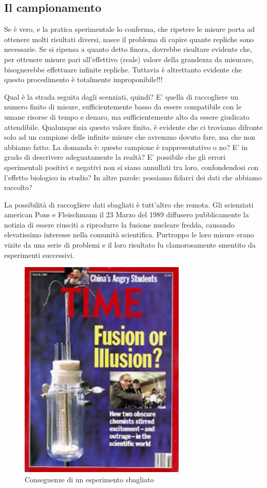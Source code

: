 \documentclass[a4paper,12pt,oneside]{book}
\theoremstyle{definition}
\theoremstyle{definition}
\theoremstyle{definition}
\theoremstyle{remark}
\begin{document}
\subsection{Il campionamento}\label{il-campionamento}

Se è vero, e la pratica sperimentale lo conferma, che ripetere le misure
porta ad ottenere molti risultati diversi, nasce il problema di capire
quante repliche sono necessarie. Se si ripensa a quanto detto finora,
dovrebbe risultare evidente che, per ottenere misure pari all'effettivo
(reale) valore della grandezza da misurare, bisognerebbe effettuare
infinite repliche. Tuttavia è altrettanto evidente che questo
procedimento è totalmente improponibile!!!

Qual è la strada seguita dagli scenziati, quindi? E' quella di
raccogliere un numero finito di misure, sufficientemente basso da essere
compatibile con le umane risorse di tempo e denaro, ma sufficientemente
alto da essere giudicato attendibile. Qualunque sia questo valore
finito, è evidente che ci troviamo difronte solo ad un campione delle
infinite misure che avremmo dovuto fare, ma che non abbiamo fatto. La
domanda è: questo campione è rappresentativo o no? E' in grado di
descrivere adeguatamente la realtà? E' possibile che gli errori
sperimentali positivi e negativi non si siano annullati tra loro,
confondendosi con l'effetto biologico in studio? In altre parole:
possiamo fidarci dei dati che abbiamo raccolto?

La possibilità di raccogliere dati sbagliati è tutt'altro che remota.
Gli scienziati american Pons e Fleischmann il 23 Marzo del 1989
diffusero pubblicamente la notizia di essere riusciti a riprodurre la
fusione nucleare fredda, causando elevatissimo interesse nella comunità
scientifica. Purtroppo le loro misure erano vizite da una serie di
problemi e il loro risultato fu clamorosamente smentito da esperimenti
successivi.

\begin{figure}

{\centering \includegraphics[width=0.5\linewidth]{_images/FalseResults} 

}

\caption{Conseguenze di un esperimento sbagliato}\label{fig:figName2}
\end{figure}
\end{document}
